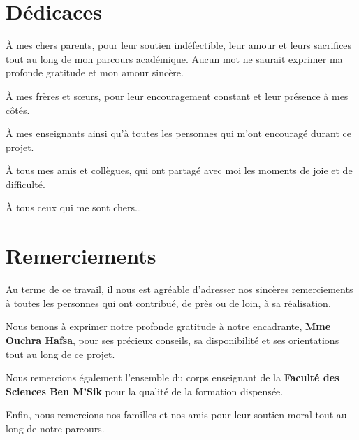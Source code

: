 \documentclass[12pt,a4paper]{report}
\begin{document}
\setcounter{page}{2}

\chapter*{Dédicaces}

À mes chers parents, pour leur soutien indéfectible, leur amour et leurs sacrifices
tout au long de mon parcours académique. Aucun mot ne saurait exprimer ma profonde
gratitude et mon amour sincère.

À mes frères et sœurs, pour leur encouragement constant et leur présence à mes côtés.

À mes enseignants ainsi qu'à toutes les personnes qui m'ont encouragé durant ce projet.

À tous mes amis et collègues, qui ont partagé avec moi les moments de joie et de
difficulté.

À tous ceux qui me sont chers\ldots

\newpage

\chapter*{Remerciements}

Au terme de ce travail, il nous est agréable d'adresser nos sincères
remerciements à toutes les personnes qui ont contribué, de près ou de
loin, à sa réalisation.

Nous tenons à exprimer notre profonde gratitude à notre encadrante,
\textbf{Mme Ouchra Hafsa}, pour ses précieux conseils, sa disponibilité
et ses orientations tout au long de ce projet.

Nous remercions également l'ensemble du corps enseignant de la
\textbf{Faculté des Sciences Ben M'Sik} pour la qualité de la formation
dispensée.

Enfin, nous remercions nos familles et nos amis pour leur soutien moral
tout au long de notre parcours.

\newpage

\tableofcontents\newpage
\listoffigures\newpage
\listoftables\newpage

\setcounter{page}{1}
\end{document}
